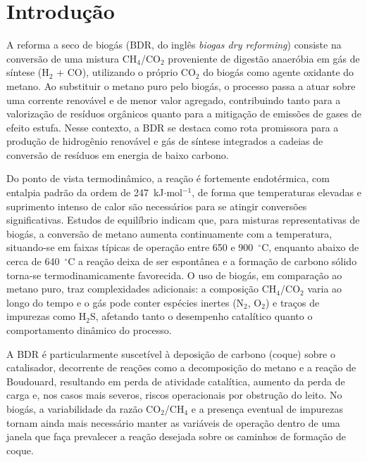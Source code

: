 
\section{Introdução}

A reforma a seco de biogás (BDR, do inglês \textit{biogas dry reforming})
consiste na conversão de uma mistura CH\(_4\)/CO\(_2\) proveniente de digestão
anaeróbia em gás de síntese (H\(_2\) + CO), utilizando o próprio CO\(_2\) do
biogás como agente oxidante do metano.\citep{lavoie2014} Ao substituir o metano
puro pelo biogás, o processo passa a atuar sobre uma corrente renovável e de
menor valor agregado, contribuindo tanto para a valorização de resíduos orgânicos
quanto para a mitigação de emissões de gases de efeito estufa.\citep{lavoie2014}
Nesse contexto, a BDR se destaca como rota promissora para a produção de
hidrogênio renovável e gás de síntese integrados a cadeias de conversão de
resíduos em energia de baixo carbono.

Do ponto de vista termodinâmico, a reação é fortemente endotérmica, com entalpia
padrão da ordem de 247~kJ\(\cdot\)mol\(^{-1}\), de forma que temperaturas elevadas e
suprimento intenso de calor são necessários para se atingir conversões
significativas.\citep{thermodynamics2025} Estudos de equilíbrio indicam que,
para misturas representativas de biogás, a conversão de metano aumenta
continuamente com a temperatura, situando-se em faixas típicas de operação
entre 650 e 900~\(^\circ\)C, enquanto abaixo de cerca de 640~\(^\circ\)C a
reação deixa de ser espontânea e a formação de carbono sólido torna-se
termodinamicamente favorecida.\citep{thermodynamics2025,lavoie2014} O uso de
biogás, em comparação ao metano puro, traz complexidades adicionais: a
composição CH\(_4\)/CO\(_2\) varia ao longo do tempo e o gás pode conter
espécies inertes (N\(_2\), O\(_2\)) e traços de impurezas como H\(_2\)S, afetando
tanto o desempenho catalítico quanto o comportamento dinâmico do processo.

A BDR é particularmente suscetível à deposição de carbono (coque) sobre o
catalisador, decorrente de reações como a decomposição do metano e a reação
de Boudouard, resultando em perda de atividade catalítica, aumento da perda de
carga e, nos casos mais severos, riscos operacionais por obstrução do
leito.\citep{lavoie2014,thermodynamics2025} No biogás, a variabilidade da
razão CO\(_2\)/CH\(_4\) e a presença eventual de impurezas tornam ainda mais
necessário manter as variáveis de operação dentro de uma janela que faça
prevalecer a reação desejada sobre os caminhos de formação de
coque.\citep{thermodynamics2025,oliveira2021}

